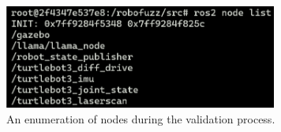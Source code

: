 \begin{figure}[ht!]
    \centering
    \includegraphics[width=0.8\textwidth]{./figures/data/ROS2_listado_nodos.png}
    \caption{An enumeration of nodes during the validation process.}
    \label{fig:ROS2_listado_nodos}
\end{figure}